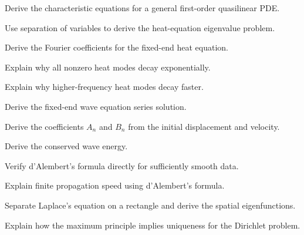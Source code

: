 \begin{exercise}[3]
Derive the characteristic equations for a general first-order
quasilinear PDE.
\end{exercise}

\begin{exercise}[3]
Use separation of variables to derive the heat-equation eigenvalue
problem.
\end{exercise}

\begin{exercise}[3]
Derive the Fourier coefficients for the fixed-end heat equation.
\end{exercise}

\begin{exercise}[3]
Explain why all nonzero heat modes decay exponentially.
\end{exercise}

\begin{exercise}[3]
Explain why higher-frequency heat modes decay faster.
\end{exercise}

\begin{exercise}[3]
Derive the fixed-end wave equation series solution.
\end{exercise}

\begin{exercise}[3]
Derive the coefficients \(A_n\) and \(B_n\) from the initial displacement
and velocity.
\end{exercise}

\begin{exercise}[3]
Derive the conserved wave energy.
\end{exercise}

\begin{exercise}[3]
Verify d'Alembert's formula directly for sufficiently smooth data.
\end{exercise}

\begin{exercise}[3]
Explain finite propagation speed using d'Alembert's formula.
\end{exercise}

\begin{exercise}[3]
Separate Laplace's equation on a rectangle and derive the spatial
eigenfunctions.
\end{exercise}

\begin{exercise}[3]
Explain how the maximum principle implies uniqueness for the Dirichlet
problem.
\end{exercise}


